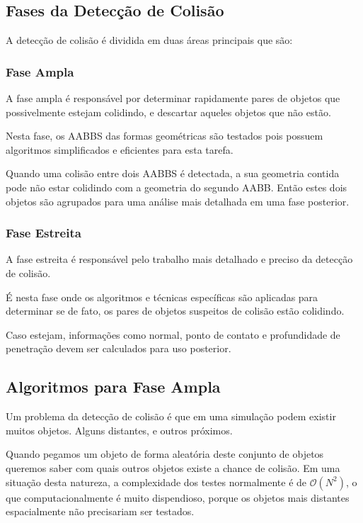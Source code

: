 \subsection{Fases da Detecção de Colisão}

A detecção de colisão é dividida em duas áreas principais que são:

\subsubsection{Fase Ampla}
A fase ampla é responsável por determinar rapidamente pares de objetos que
possivelmente estejam colidindo, e descartar aqueles objetos que não estão.

Nesta fase, os AABBS das formas geométricas são testados pois possuem
algoritmos simplificados e eficientes para esta tarefa.

Quando uma colisão entre dois AABBS é detectada, a sua geometria contida pode
não estar colidindo com a geometria do segundo AABB. Então estes dois objetos
são agrupados para uma análise mais detalhada em uma fase posterior.

\subsubsection{Fase Estreita}
A fase estreita é responsável pelo trabalho mais detalhado e preciso da
detecção de colisão.

É nesta fase onde os algoritmos e técnicas específicas são
aplicadas para determinar se de fato, os pares de objetos suspeitos de colisão
estão colidindo.

Caso estejam, informações como normal, ponto de contato e profundidade de
penetração devem ser calculados para uso posterior.

\subsection{Algoritmos para Fase Ampla}
Um problema da detecção de colisão é que em uma simulação podem existir muitos
objetos. Alguns distantes, e outros próximos.

Quando pegamos um objeto de forma aleatória deste conjunto de objetos queremos saber com quais outros objetos
existe a chance de colisão.
Em uma situação desta natureza, a complexidade dos testes normalmente é de $\mathcal{O}(N^2)$, o que
computacionalmente é muito dispendioso, porque os objetos mais distantes
espacialmente não precisariam ser testados.

